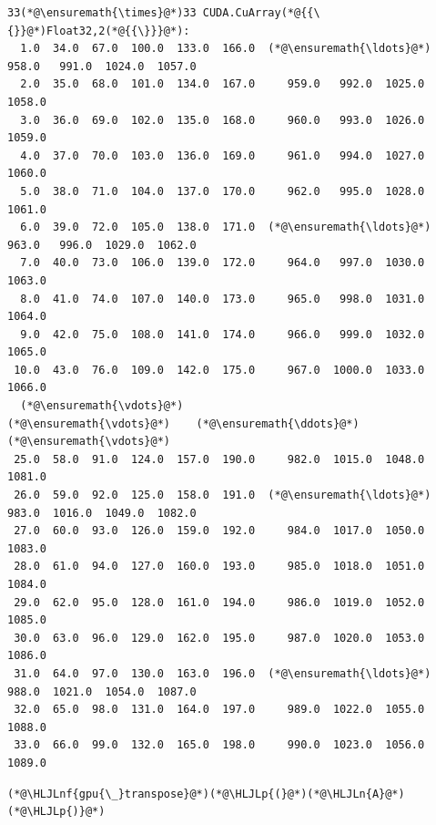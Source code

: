 \documentclass[12pt,a4paper]{article}
\newcommand{\HLJLn}[1]{#1}
\newcommand{\HLJLnf}[1]{\textcolor[RGB]{66,102,213}{#1}}
\newcommand{\HLJLp}[1]{#1}
\begin{document}
\begin{lstlisting}
33(*@\ensuremath{\times}@*)33 CUDA.CuArray(*@{{\{}}@*)Float32,2(*@{{\}}}@*):
  1.0  34.0  67.0  100.0  133.0  166.0  (*@\ensuremath{\ldots}@*)  958.0   991.0  1024.0  1057.0
  2.0  35.0  68.0  101.0  134.0  167.0     959.0   992.0  1025.0  1058.0
  3.0  36.0  69.0  102.0  135.0  168.0     960.0   993.0  1026.0  1059.0
  4.0  37.0  70.0  103.0  136.0  169.0     961.0   994.0  1027.0  1060.0
  5.0  38.0  71.0  104.0  137.0  170.0     962.0   995.0  1028.0  1061.0
  6.0  39.0  72.0  105.0  138.0  171.0  (*@\ensuremath{\ldots}@*)  963.0   996.0  1029.0  1062.0
  7.0  40.0  73.0  106.0  139.0  172.0     964.0   997.0  1030.0  1063.0
  8.0  41.0  74.0  107.0  140.0  173.0     965.0   998.0  1031.0  1064.0
  9.0  42.0  75.0  108.0  141.0  174.0     966.0   999.0  1032.0  1065.0
 10.0  43.0  76.0  109.0  142.0  175.0     967.0  1000.0  1033.0  1066.0
  (*@\ensuremath{\vdots}@*)                                (*@\ensuremath{\vdots}@*)    (*@\ensuremath{\ddots}@*)            (*@\ensuremath{\vdots}@*)            
 25.0  58.0  91.0  124.0  157.0  190.0     982.0  1015.0  1048.0  1081.0
 26.0  59.0  92.0  125.0  158.0  191.0  (*@\ensuremath{\ldots}@*)  983.0  1016.0  1049.0  1082.0
 27.0  60.0  93.0  126.0  159.0  192.0     984.0  1017.0  1050.0  1083.0
 28.0  61.0  94.0  127.0  160.0  193.0     985.0  1018.0  1051.0  1084.0
 29.0  62.0  95.0  128.0  161.0  194.0     986.0  1019.0  1052.0  1085.0
 30.0  63.0  96.0  129.0  162.0  195.0     987.0  1020.0  1053.0  1086.0
 31.0  64.0  97.0  130.0  163.0  196.0  (*@\ensuremath{\ldots}@*)  988.0  1021.0  1054.0  1087.0
 32.0  65.0  98.0  131.0  164.0  197.0     989.0  1022.0  1055.0  1088.0
 33.0  66.0  99.0  132.0  165.0  198.0     990.0  1023.0  1056.0  1089.0
\end{lstlisting}


\begin{lstlisting}
(*@\HLJLnf{gpu{\_}transpose}@*)(*@\HLJLp{(}@*)(*@\HLJLn{A}@*)(*@\HLJLp{)}@*)
\end{lstlisting}
\end{document}
